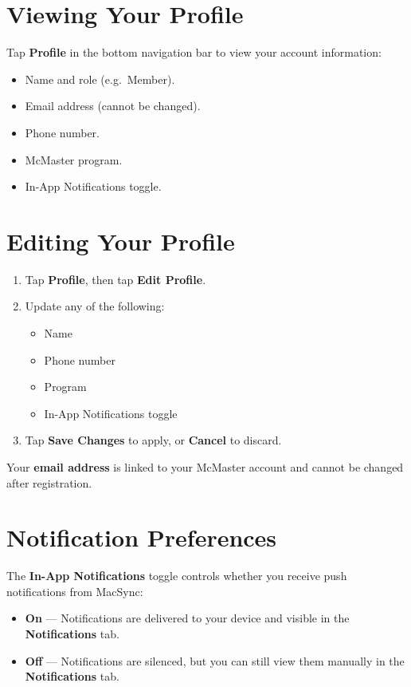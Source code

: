 \documentclass[12pt, twoside]{report}
\newcommand{\uielem}[1]{\textbf{#1}}
\begin{document}
\section{Viewing Your Profile}

Tap \uielem{Profile} in the bottom navigation bar to view your account
information:

\begin{itemize}
  \item Name and role (e.g.\ Member).
  \item Email address (cannot be changed).
  \item Phone number.
  \item McMaster program.
  \item In-App Notifications toggle.
\end{itemize}

\section{Editing Your Profile}

\begin{enumerate}
  \item Tap \uielem{Profile}, then tap \uielem{Edit Profile}.
  \item Update any of the following:
    \begin{itemize}
      \item Name
      \item Phone number
      \item Program
      \item In-App Notifications toggle
    \end{itemize}
  \item Tap \uielem{Save Changes} to apply, or \uielem{Cancel} to discard.
\end{enumerate}

\begin{notebox}
Your \textbf{email address} is linked to your McMaster account and
cannot be changed after registration.
\end{notebox}

\section{Notification Preferences}

The \uielem{In-App Notifications} toggle controls whether you receive push
notifications from MacSync:

\begin{itemize}
  \item \textbf{On} --- Notifications are delivered to your device and
        visible in the \uielem{Notifications} tab.
  \item \textbf{Off} --- Notifications are silenced, but you can still
        view them manually in the \uielem{Notifications} tab.
\end{itemize}
\end{document}
